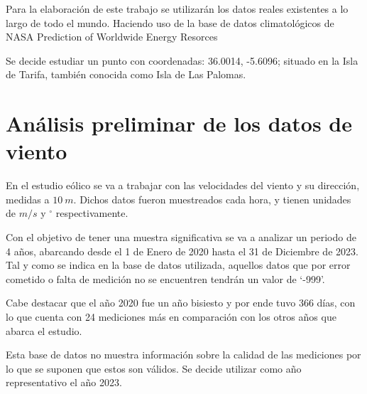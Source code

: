 \documentclass{IEEEtran}
\begin{document}
Para la elaboración de este trabajo se utilizarán los datos reales existentes a lo largo de todo el mundo. Haciendo uso de la base de datos climatológicos de NASA Prediction of Worldwide Energy Resorces \cite{NASA2024}

Se decide estudiar un punto con coordenadas: 36.0014, -5.6096; situado en la Isla de Tarifa, también conocida como Isla de Las Palomas.

\section{Análisis preliminar de los datos de viento}



En el estudio eólico se va a trabajar con las velocidades del viento y su dirección, medidas a $10\ m$. Dichos datos fueron muestreados cada hora, y tienen unidades de $m/s$ y $^\circ$ respectivamente.


Con el objetivo de tener una muestra significativa se va a analizar un periodo de 4 años, abarcando desde el 1 de Enero de 2020 hasta el 31 de Diciembre de 2023. Tal y como se indica en la base de datos utilizada, aquellos datos que por error cometido o falta de medición no se encuentren tendrán un valor de `-999'.

Cabe destacar que el año 2020 fue un año bisiesto y por ende tuvo 366 días, con lo que cuenta con 24 mediciones más en comparación con los otros años que abarca el estudio.


Esta base de datos no muestra información sobre la calidad de las mediciones por lo que se suponen que estos son válidos. Se decide utilizar como año representativo el año 2023.
\end{document}
